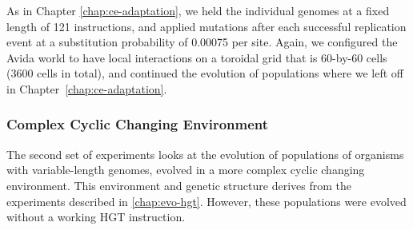 \documentclass[PhD]{msu-thesis}
\begin{document}
As in Chapter \ref{chap:ce-adaptation}, we held the individual genomes at a fixed length of 121 instructions, and applied mutations after each successful replication event at a substitution probability of 0.00075 per site.
Again,
we configured the Avida world to have local interactions on a toroidal grid that is 60-by-60 cells (3600 cells in total), and continued the evolution of populations where we left off in Chapter~\ref{chap:ce-adaptation}.

\subsubsection{Complex Cyclic Changing Environment}
The second set of experiments looks at the evolution of populations of organisms with variable-length genomes, 
evolved in a more complex cyclic changing environment. This environment and genetic structure derives from the experiments described in \ref{chap:evo-hgt}. However, these populations were evolved without a working HGT instruction.
\end{document}
